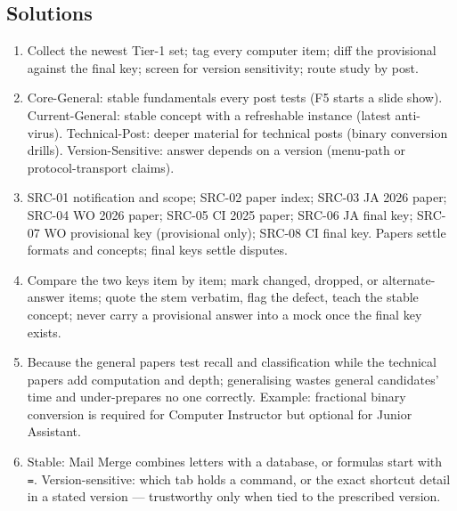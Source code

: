 \documentclass[11pt]{article}
\begin{document}
\subsection*{Solutions}
\begingroup\small
\begin{enumerate}[label=\arabic*.]
  \item Collect the newest Tier-1 set; tag every computer item; diff the provisional against the final key; screen for version sensitivity; route study by post.
  \item Core-General: stable fundamentals every post tests (F5 starts a slide show). Current-General: stable concept with a refreshable instance (latest anti-virus). Technical-Post: deeper material for technical posts (binary conversion drills). Version-Sensitive: answer depends on a version (menu-path or protocol-transport claims).
  \item SRC-01 notification and scope; SRC-02 paper index; SRC-03 JA 2026 paper; SRC-04 WO 2026 paper; SRC-05 CI 2025 paper; SRC-06 JA final key; SRC-07 WO provisional key (provisional only); SRC-08 CI final key. Papers settle formats and concepts; final keys settle disputes.
  \item Compare the two keys item by item; mark changed, dropped, or alternate-answer items; quote the stem verbatim, flag the defect, teach the stable concept; never carry a provisional answer into a mock once the final key exists.
  \item Because the general papers test recall and classification while the technical papers add computation and depth; generalising wastes general candidates' time and under-prepares no one correctly. Example: fractional binary conversion is required for Computer Instructor but optional for Junior Assistant.
  \item Stable: Mail Merge combines letters with a database, or formulas start with \texttt{=}. Version-sensitive: which tab holds a command, or the exact shortcut detail in a stated version --- trustworthy only when tied to the prescribed version.
\end{enumerate}
\endgroup
\end{document}
